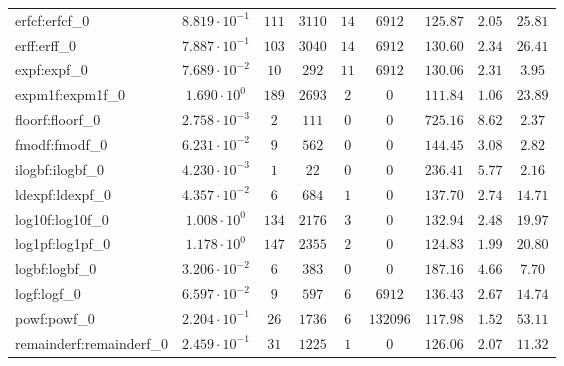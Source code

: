 \begin{tabular}{|l|c|c|c|c|c|c|c|c|}
erfcf:erfcf\_0               & $ 8.819 \cdot 10^{-1} $ & $ 111    $ & $ 3110  $ & $ 14  $ & $ 6912   $ & $ 125.87      $ & $ 2.05    $ & $ 25.81   $ \\
erff:erff\_0                 & $ 7.887 \cdot 10^{-1} $ & $ 103    $ & $ 3040  $ & $ 14  $ & $ 6912   $ & $ 130.60      $ & $ 2.34    $ & $ 26.41   $ \\
expf:expf\_0                 & $ 7.689 \cdot 10^{-2} $ & $ 10     $ & $ 292   $ & $ 11  $ & $ 6912   $ & $ 130.06      $ & $ 2.31    $ & $ 3.95    $ \\
expm1f:expm1f\_0             & $ 1.690 \cdot 10^{0}  $ & $ 189    $ & $ 2693  $ & $ 2   $ & $ 0      $ & $ 111.84      $ & $ 1.06    $ & $ 23.89   $ \\
floorf:floorf\_0             & $ 2.758 \cdot 10^{-3} $ & $ 2      $ & $ 111   $ & $ 0   $ & $ 0      $ & $ 725.16      $ & $ 8.62    $ & $ 2.37    $ \\
fmodf:fmodf\_0               & $ 6.231 \cdot 10^{-2} $ & $ 9      $ & $ 562   $ & $ 0   $ & $ 0      $ & $ 144.45      $ & $ 3.08    $ & $ 2.82    $ \\
ilogbf:ilogbf\_0             & $ 4.230 \cdot 10^{-3} $ & $ 1      $ & $ 22    $ & $ 0   $ & $ 0      $ & $ 236.41      $ & $ 5.77    $ & $ 2.16    $ \\
ldexpf:ldexpf\_0             & $ 4.357 \cdot 10^{-2} $ & $ 6      $ & $ 684   $ & $ 1   $ & $ 0      $ & $ 137.70      $ & $ 2.74    $ & $ 14.71   $ \\
log10f:log10f\_0             & $ 1.008 \cdot 10^{0}  $ & $ 134    $ & $ 2176  $ & $ 3   $ & $ 0      $ & $ 132.94      $ & $ 2.48    $ & $ 19.97   $ \\
log1pf:log1pf\_0             & $ 1.178 \cdot 10^{0}  $ & $ 147    $ & $ 2355  $ & $ 2   $ & $ 0      $ & $ 124.83      $ & $ 1.99    $ & $ 20.80   $ \\
logbf:logbf\_0               & $ 3.206 \cdot 10^{-2} $ & $ 6      $ & $ 383   $ & $ 0   $ & $ 0      $ & $ 187.16      $ & $ 4.66    $ & $ 7.70    $ \\
logf:logf\_0                 & $ 6.597 \cdot 10^{-2} $ & $ 9      $ & $ 597   $ & $ 6   $ & $ 6912   $ & $ 136.43      $ & $ 2.67    $ & $ 14.74   $ \\
powf:powf\_0                 & $ 2.204 \cdot 10^{-1} $ & $ 26     $ & $ 1736  $ & $ 6   $ & $ 132096 $ & $ 117.98      $ & $ 1.52    $ & $ 53.11   $ \\
remainderf:remainderf\_0     & $ 2.459 \cdot 10^{-1} $ & $ 31     $ & $ 1225  $ & $ 1   $ & $ 0      $ & $ 126.06      $ & $ 2.07    $ & $ 11.32   $ \\

\end{tabular}
